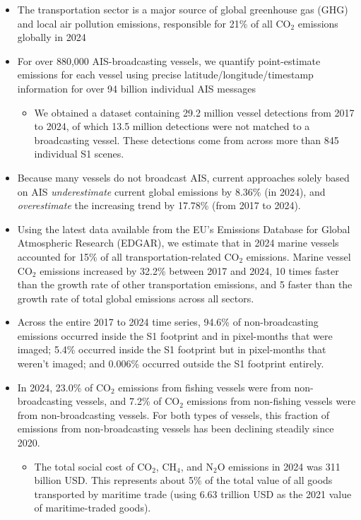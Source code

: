 \documentclass[
  letterpaper,
  DIV=11,
  numbers=noendperiod]{scrartcl}
\providecommand{\tightlist}{%
  \setlength{\itemsep}{0pt}\setlength{\parskip}{0pt}}
\begin{document}
\begin{itemize}
\item
  The transportation sector is a major source of global greenhouse gas
  (GHG) and local air pollution emissions, responsible for 21\% of all
  CO\(_{2}\) emissions globally in 2024
\item
  For over 880,000 AIS-broadcasting vessels, we quantify point-estimate
  emissions for each vessel using precise latitude/longitude/timestamp
  information for over 94 billion individual AIS messages

  \begin{itemize}
  \tightlist
  \item
    We obtained a dataset containing 29.2 million vessel detections from
    2017 to 2024, of which 13.5 million detections were not matched to a
    broadcasting vessel. These detections come from across more than 845
    individual S1 scenes.
  \end{itemize}
\item
  Because many vessels do not broadcast AIS, current approaches solely
  based on AIS \textit{underestimate} current global emissions by 8.36\%
  (in 2024), and \textit{overestimate} the increasing trend by 17.78\%
  (from 2017 to 2024).
\item
  Using the latest data available from the EU's Emissions Database for
  Global Atmospheric Research (EDGAR), we estimate that in 2024 marine
  vessels accounted for 15\% of all transportation-related CO\(_{2}\)
  emissions. Marine vessel CO\(_{2}\) emissions increased by 32.2\%
  between 2017 and 2024, 10 times faster than the growth rate of other
  transportation emissions, and 5 faster than the growth rate of total
  global emissions across all sectors.
\item
  Across the entire 2017 to 2024 time series, 94.6\% of non-broadcasting
  emissions occurred inside the S1 footprint and in pixel-months that
  were imaged; 5.4\% occurred inside the S1 footprint but in
  pixel-months that weren't imaged; and 0.006\% occurred outside the S1
  footprint entirely.
\item
  In 2024, 23.0\% of CO\(_{2}\) emissions from fishing vessels were from
  non-broadcasting vessels, and 7.2\% of CO\(_{2}\) emissions from
  non-fishing vessels were from non-broadcasting vessels. For both types
  of vessels, this fraction of emissions from non-broadcasting vessels
  has been declining steadily since 2020.

  \begin{itemize}
  \tightlist
  \item
    The total social cost of CO\(_{2}\), CH\(_{4}\), and N\(_{2}\)O
    emissions in 2024 was 311 billion USD. This represents about 5\% of
    the total value of all goods transported by maritime trade (using
    6.63 trillion USD as the 2021 value of maritime-traded goods).
  \end{itemize}


\end{itemize}
\end{document}
